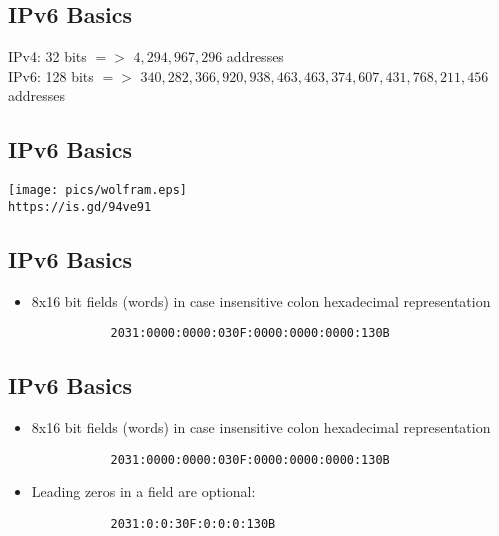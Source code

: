 \documentclass[xga]{xdvislides}
\begin{document}
\subsection{IPv6 Basics}
\Hugesize
\begin{center}
IPv4: 32 bits $=>$ $4,294,967,296$ addresses \\
\vspace{.5in}
IPv6: 128 bits $=>$ $340,282,366,920,938,463,463,374,607,431,768,211,456$ addresses \\
\vspace{.5in}
\end{center}
\Normalsize

\subsection{IPv6 Basics}
\vspace*{\fill}
\begin{center}
	\texttt{[image: pics/wolfram.eps]} \\
	\verb+https://is.gd/94ve91+
\end{center}
\vspace*{\fill}

\subsection{IPv6 Basics}
\begin{itemize}
	\item 8x16 bit fields (words) in case insensitive colon hexadecimal
		representation
\begin{verbatim}
           2031:0000:0000:030F:0000:0000:0000:130B
\end{verbatim}
\end{itemize}

\subsection{IPv6 Basics}
\begin{itemize}
	\item 8x16 bit fields (words) in case insensitive colon hexadecimal
		representation
\begin{verbatim}
           2031:0000:0000:030F:0000:0000:0000:130B
\end{verbatim}
	\item Leading zeros in a field are optional:
\begin{verbatim}
           2031:0:0:30F:0:0:0:130B
\end{verbatim}
\end{itemize}
\end{document}
